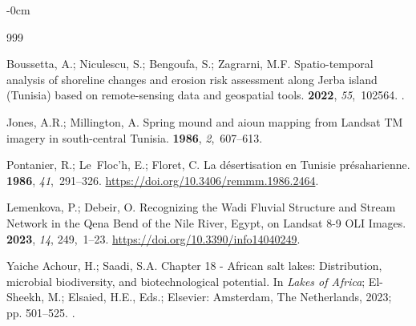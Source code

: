 \documentclass[land,article,accept,pdftex,moreauthors]{Definitions/mdpi}
\begin{document}
\begin{adjustwidth}{-\extralength}{0cm}


 \begin{thebibliography}{999}

Boussetta, A.; Niculescu, S.; Bengoufa, S.; Zagrarni, M.F.
\newblock Spatio-temporal analysis of shoreline changes and erosion risk
  assessment along Jerba island (Tunisia) based on remote-sensing data and
  geospatial tools.
 {\bf 2022}, {\em
  55},~102564.
.

Jones, A.R.; Millington, A.
\newblock Spring mound and aioun mapping from Landsat TM imagery in
  south-central Tunisia.
 {\bf 1986}, {\em 2},~607--613.

Pontanier, R.; Le~Floc'h, E.; Floret, C.
\newblock La désertisation en Tunisie présaharienne.
 {\bf 1986},
  {\em 41},~291--326.
\newblock %
  {\url{https://doi.org/10.3406/remmm.1986.2464}}.

Lemenkova, P.; Debeir, O.
\newblock Recognizing the Wadi Fluvial Structure and Stream Network in the Qena
  Bend of the Nile River, Egypt, on Landsat 8-9 OLI Images.
 {\bf 2023}, {\em 14}, 249,~1--23. %
 {\url{https://doi.org/10.3390/info14040249}}.

{Yaiche Achour}, H.; Saadi, S.A.
\newblock Chapter 18 - African salt lakes: Distribution, microbial
  biodiversity, and biotechnological potential. In {\em Lakes of Africa};
  El-Sheekh, M.; Elsaied, H.E., Eds.; Elsevier: Amsterdam, The Netherlands, %
 2023; pp. 501--525.
.


\end{thebibliography}
\end{adjustwidth}
\end{document}
